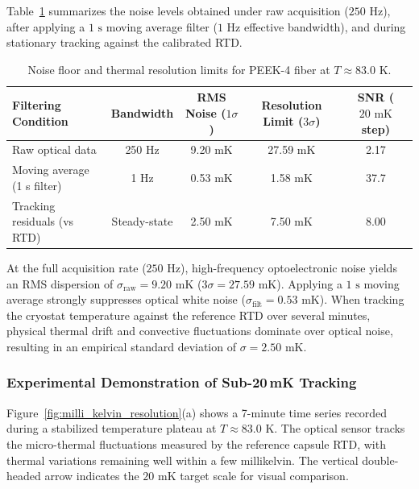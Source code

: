 \documentclass[preprint,11pt]{elsarticle}
\begin{document}
Table~\ref{tab:noise_resolution_summary} summarizes the noise levels obtained under raw acquisition ($250\text{ Hz}$), after applying a $1\text{ s}$ moving average filter ($1\text{ Hz}$ effective bandwidth), and during stationary tracking against the calibrated RTD.

\begin{table}[htpb]
    \centering
    \small
    \caption{Noise floor and thermal resolution limits for PEEK-4 fiber at $T \approx 83.0\text{ K}$.}
    \label{tab:noise_resolution_summary}
    \begin{tabular}{lcccc}
        \toprule
        \textbf{Filtering Condition} & \textbf{Bandwidth} & \textbf{RMS Noise ($1\sigma$)} & \textbf{Resolution Limit ($3\sigma$)} & \textbf{SNR ($20\text{ mK}$ step)} \\
        \midrule
        Raw optical data             & 250 Hz             & 9.20 mK                         & 27.59 mK                              & 2.17 \\
        Moving average (1 s filter)  & 1 Hz               & 0.53 mK                         &  1.58 mK                              & 37.7 \\
        Tracking residuals (vs RTD)  & Steady-state       & 2.50 mK                         &  7.50 mK                              & 8.00 \\
        \bottomrule
    \end{tabular}
\end{table}

At the full acquisition rate ($250\text{ Hz}$), high-frequency optoelectronic noise yields an RMS dispersion of $\sigma_{\mathrm{raw}} = 9.20\text{ mK}$ ($3\sigma = 27.59\text{ mK}$). Applying a $1\text{ s}$ moving average strongly suppresses optical white noise ($\sigma_{\mathrm{filt}} = 0.53\text{ mK}$). When tracking the cryostat temperature against the reference RTD over several minutes, physical thermal drift and convective fluctuations dominate over optical noise, resulting in an empirical standard deviation of $\sigma = 2.50\text{ mK}$.

\subsubsection{Experimental Demonstration of Sub-20\,mK Tracking}

Figure~\ref{fig:milli_kelvin_resolution}(a) shows a 7-minute time series recorded during a stabilized temperature plateau at $T \approx 83.0\text{ K}$. The optical sensor tracks the micro-thermal fluctuations measured by the reference capsule RTD, with thermal variations remaining well within a few millikelvin. The vertical double-headed arrow indicates the $20\text{ mK}$ target scale for visual comparison.
\end{document}
